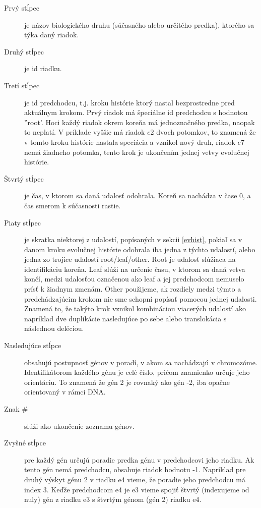 \begin{description}

\item[Prvý stĺpec] je názov biologického druhu (súčasného alebo určitého predka),
ktorého sa týka daný riadok.

\item[Druhý stĺpec] je id riadku.

\item[Tretí stĺpec] je id predchodcu, t.j. kroku histórie ktorý nastal bezprostredne pred aktuálnym krokom.
Prvý riadok má špeciálne id predchodcu s hodnotou ''root'. Hoci každý riadok okrem koreňa má jednoznačného predka, naopak to neplatí.
V príklade vyššie má riadok $e2$ dvoch potomkov, 
to znamená že v tomto kroku histórie nastala speciácia a vznikol nový druh, riadok $e7$ nemá žiadneho potomka, 
tento krok je ukončením jednej vetvy evolučnej histórie.

\item[Štvrtý stĺpec] je čas, v ktorom sa daná udalosť odohrala. Koreň sa nachádza v čase 0, a čas smerom k súčasnosti rastie.

\item[Piaty stĺpec] je skratka niektorej z udalostí, popísaných v sekcii \ref{evhist}, pokiaľ sa v danom kroku evolučnej histórie odohrala iba jedna z týchto udalostí, alebo jedna zo trojice udalostí root/leaf/other.
Root je udalosť slúžiaca na identifikáciu koreňa.
Leaf slúži na určenie času, v ktorom sa daná vetva končí, medzi udalosťou označenou ako leaf a jej predchodcom nemuselo prísť k žiadnym zmenám.
Other použijeme, ak rozdiely medzi týmto a predchádzajúcim krokom nie sme schopní popísať pomocou jednej udalosti.
Znamená to, že takýto krok vznikol kombináciou viacerých udalostí ako napríklad dve duplikácie nasledujúce po sebe alebo translokácia s následnou deléciou.

\item [Nasledujúce stĺpce] obsahujú postupnosť génov v poradí, v akom sa nachádzajú v chromozóme.
Identifikátorom každého génu je celé číslo, pričom znamienko určuje jeho orientáciu. 
To znamená že gén 2 je rovnaký ako gén -2, iba opačne orientovaný v rámci DNA.

\item [Znak \#] slúži ako ukončenie zoznamu génov.

\item[Zvyšné stĺpce] pre každý gén určujú poradie predka génu v predchodcovi jeho riadku. Ak tento gén nemá predchodcu, obsahuje riadok hodnotu -1.
Napríklad pre druhý výskyt génu 2 v riadku e4 vieme, že poradie jeho predchodcu má index 3. Keďže predchodcom e4 je e3 vieme spojiť štvrtý (indexujeme od nuly) gén z riadku e3 s štvrtým génom (gén 2) riadku e4.

\end{description}


